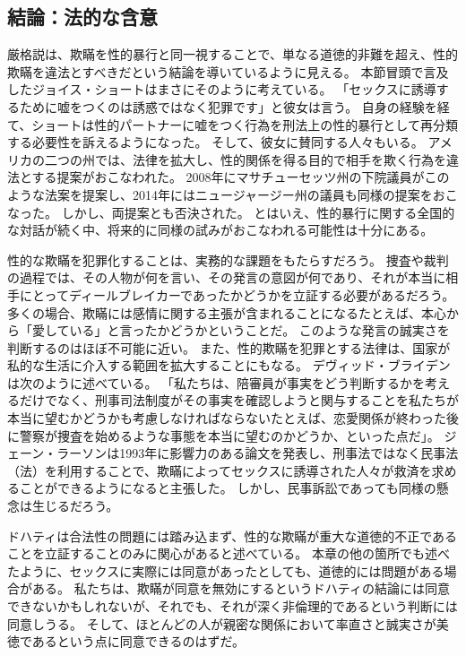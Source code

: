 \documentclass[paper=a4,book,openany]{jlreq} \usepackage{mystyle}
\begin{document}
\subsection{結論：法的な含意}

厳格説は、欺瞞を性的暴行と同一視することで、単なる道徳的非難を超え、性的欺瞞を違法とすべきだという結論を導いているように見える。
本節冒頭で言及したジョイス・ショートはまさにそのように考えている。
「セックスに誘導するために嘘をつくのは誘惑ではなく犯罪です」と彼女は言う\citep{mcarthur16:_is_lying_get_laid_form_sexual_assaul}。
自身の経験を経て、ショートは性的パートナーに嘘をつく行為を刑法上の性的暴行として再分類する必要性を訴えるようになった。
そして、彼女に賛同する人々もいる。
アメリカの二つの州では、法律を拡大し、性的関係を得る目的で相手を欺く行為を違法とする提案がおこなわれた。
2008年にマサチューセッツ州の下院議員がこのような法案を提案し、2014年にはニュージャージー州の議員も同様の提案をおこなった。
しかし、両提案とも否決された。
とはいえ、性的暴行に関する全国的な対話が続く中、将来的に同様の試みがおこなわれる可能性は十分にある。

性的な欺瞞を犯罪化することは、実務的な課題をもたらすだろう。
捜査や裁判の過程では、その人物が何を言い、その発言の意図が何であり、それが本当に相手にとってディールブレイカーであったかどうかを立証する必要があるだろう。
多くの場合、欺瞞には感情に関する主張が含まれることになる{\DDASH}たとえば、本心から「愛している」と言ったかどうかということだ。
このような発言の誠実さを判断するのはほぼ不可能に近い。
また、性的欺瞞を犯罪とする法律は、国家が私的な生活に介入する範囲を拡大することにもなる。
デヴィッド・ブライデンは次のように述べている。
「私たちは、陪審員が事実をどう判断するかを考えるだけでなく、刑事司法制度がその事実を確認しようと関与することを私たちが本当に望むかどうかも考慮しなければならない{\DDASH}たとえば、恋愛関係が終わった後に警察が捜査を始めるような事態を本当に望むのかどうか、といった点だ」\citep[p.469]{bryden00:_redef_rape}。
ジェーン・ラーソンは1993年に影響力のある論文を発表し、刑事法ではなく民事法（法）を利用することで、欺瞞によってセックスに誘導された人々が救済を求めることができるようになると主張した\citep{larson93:_women_under_so_littl_they}。
しかし、民事訴訟であっても同様の懸念は生じるだろう。

ドハティは合法性の問題には踏み込まず、性的な欺瞞が重大な道徳的不正であることを立証することのみに関心があると述べている。
本章の他の箇所でも述べたように、セックスに実際には同意があったとしても、道徳的には問題がある場合がある。
私たちは、欺瞞が同意を無効にするというドハティの結論には同意できないかもしれないが、それでも、それが深く非倫理的であるという判断には同意しうる。
そして、ほとんどの人が親密な関係において率直さと誠実さが美徳であるという点に同意できるのはずだ。
\end{document}
